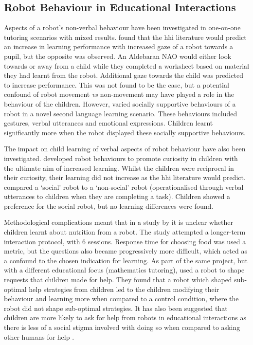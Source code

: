 \subsection{Robot Behaviour in Educational Interactions}
Aspects of a robot's non-verbal behaviour have been investigated in one-on-one tutoring scenarios with mixed results. \cite{herberg2015robot} found that the \acrshort{hhi} literature would predict an increase in learning performance with increased gaze of a robot towards a pupil, but the opposite was observed. An Aldebaran NAO would either look towards or away from a child while they completed a worksheet based on material they had learnt from the robot. Additional gaze towards the child was predicted to increase performance. This was not found to be the case, but a potential confound of robot movement \textit{vs} non-movement may have played a role in the behaviour of the children. However, \cite{saerbeck2010expressive} varied socially supportive behaviours of a robot in a novel second language learning scenario. These behaviours included gestures, verbal utterances and emotional expressions. Children learnt significantly more when the robot displayed these socially supportive behaviours.

The impact on child learning of verbal aspects of robot behaviour have also been investigated. \cite{gordon2015curiosity} developed robot behaviours to promote curiosity in children with the ultimate aim of increased learning. Whilst the children were reciprocal in their curiosity, their learning did not increase as the \acrshort{hhi} literature would predict. \cite{kanda2012children} compared a `social' robot to a `non-social' robot (operationalised through verbal utterances to children when they are completing a task). Children showed a preference for the social robot, but no learning differences were found.

Methodological complications meant that in a study by \cite{short2014train} it is unclear whether children learnt about nutrition from a robot. The study attempted a longer-term interaction protocol, with 6 sessions. Response time for choosing food was used a metric, but the questions also became progressively more difficult, which acted as a confound to the chosen indication for learning. As part of the same project, but with a different educational focus (mathematics tutoring), \cite{ramachandran2016shaping} used a robot to shape requests that children made for help. They found that a robot which shaped sub-optimal help strategies from children led to the children modifying their behaviour and learning more when compared to a control condition, where the robot did not shape sub-optimal strategies. It has also been suggested that children are more likely to ask for help from robots in educational interactions as there is less of a social stigma involved with doing so when compared to asking other humans for help \citep{howley2014effects}.

